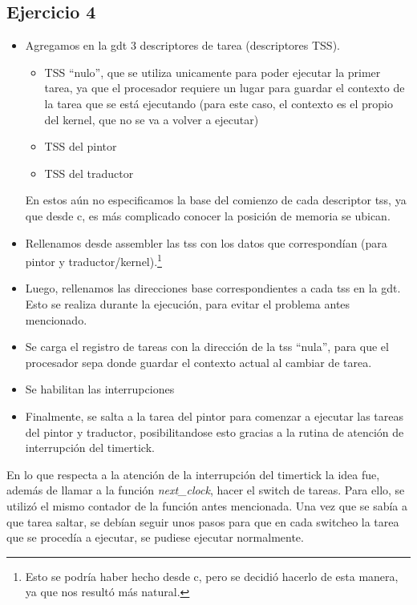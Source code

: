\subsection{Ejercicio 4}
\begin{itemize}
 \item Agregamos en la gdt 3 descriptores de tarea (descriptores TSS).
	\begin{itemize}
 		\item TSS ``nulo'', que se utiliza unicamente para poder ejecutar la primer tarea, ya que el procesador requiere un lugar para guardar el contexto de la tarea que se est\'a ejecutando (para este caso, el contexto es el propio del kernel, que no se va a volver a ejecutar)
		\item TSS del pintor
		\item TSS del traductor
	\end{itemize}
	En estos a\'un no especificamos la base del comienzo de cada descriptor tss, ya que desde c, es m\'as complicado conocer la posici\'on de memoria se ubican.

 \item Rellenamos desde assembler las tss con los datos que correspond\'ian (para pintor y traductor/kernel).\footnote{Esto se podr\'ia haber hecho desde c, pero se decidi\'o hacerlo de esta manera, ya que nos result\'o m\'as natural.}
 \item Luego, rellenamos las direcciones base correspondientes a cada tss en la gdt. Esto se realiza durante la ejecuci\'on, para evitar el problema antes mencionado.
 \item Se carga el registro de tareas con la direcci\'on de la tss ``nula'', para que el procesador sepa donde guardar el contexto actual al cambiar de tarea.
 \item Se habilitan las interrupciones
 \item Finalmente, se salta a la tarea del pintor para comenzar a ejecutar las tareas del pintor y traductor, posibilitandose esto gracias a la rutina de atenci\'on de interrupci\'on del timertick.
\end{itemize}

En lo que respecta a la atenci\'on de la interrupci\'on del timertick la idea fue, adem\'as de llamar a la funci\'on \textit{next\_clock}, hacer el switch de tareas. Para ello, se utiliz\'o el mismo contador de la funci\'on antes mencionada. Una vez que se sab\'ia a que tarea saltar, se deb\'ian seguir unos pasos para que en cada switcheo la tarea que se proced\'ia a ejecutar, se pudiese ejecutar normalmente.
